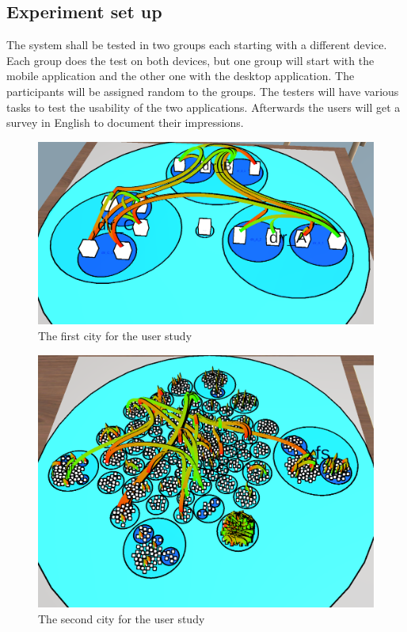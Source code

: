 \subsection{Experiment set up}
\label{experiment}
The system shall be tested in two groups each starting with a different device.
Each group does the test on both devices, but one group will start with the mobile application and the other one with the desktop application.
The participants will be assigned random to the groups.
The testers will have various tasks to test the usability of the two applications.
Afterwards the users will get a survey in English to document their impressions.
\begin{figure}[H]
  \centering
  \includegraphics[width=1\textwidth]{Evaluation/img/city_1.png}
  \caption{The first \gls{city} for the user study}\label{fig:city1}
\end{figure}

\begin{figure}[H]
  \centering
  \includegraphics[width=1\textwidth]{Evaluation/img/city_2.png}
  \caption{The second \gls{city} for the user study}\label{fig:city2}
\end{figure}

